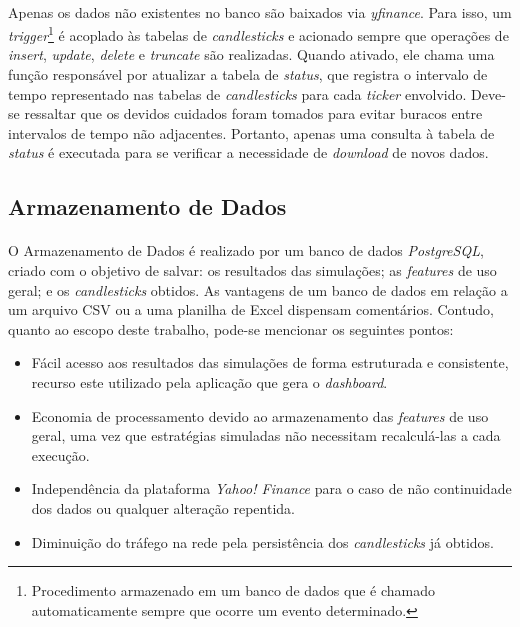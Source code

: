 \paragraph{} Apenas os dados não existentes no banco são baixados via \textit{yfinance}. Para isso, um \textit{trigger}\footnote{Procedimento armazenado em um banco de dados que é chamado automaticamente sempre que ocorre um evento determinado.} é acoplado às tabelas de \textit{candlesticks} e acionado sempre que operações de \textit{insert}, \textit{update}, \textit{delete} e \textit{truncate} são realizadas. Quando ativado, ele chama uma função responsável por atualizar a tabela de \textit{status}, que registra o intervalo de tempo representado nas tabelas de \textit{candlesticks} para cada \textit{ticker} envolvido. Deve-se ressaltar que os devidos cuidados foram tomados para evitar buracos entre intervalos de tempo não adjacentes. Portanto, apenas uma consulta à tabela de \textit{status} é executada para se verificar a necessidade de \textit{download} de novos dados.



\FloatBarrier
\subsection{Armazenamento de Dados}

\paragraph{} O Armazenamento de Dados é realizado por um banco de dados \textit{PostgreSQL}, criado com o objetivo de salvar: os resultados das simulações; as \textit{features} de uso geral; e os \textit{candlesticks} obtidos. As vantagens de um banco de dados em relação a um arquivo CSV ou a uma planilha de Excel dispensam comentários. Contudo, quanto ao escopo deste trabalho, pode-se mencionar os seguintes pontos:

\begin{itemize}
    \item Fácil acesso aos resultados das simulações de forma estruturada e consistente, recurso este utilizado pela aplicação que gera o \textit{dashboard}.
    \item Economia de processamento devido ao armazenamento das \textit{features} de uso geral, uma vez que estratégias simuladas não necessitam recalculá-las a cada execução.
    \item Independência da plataforma \textit{Yahoo! Finance} para o caso de não continuidade dos dados ou qualquer alteração repentida.
    \item Diminuição do tráfego na rede pela persistência dos \textit{candlesticks} já obtidos.
\end{itemize}

